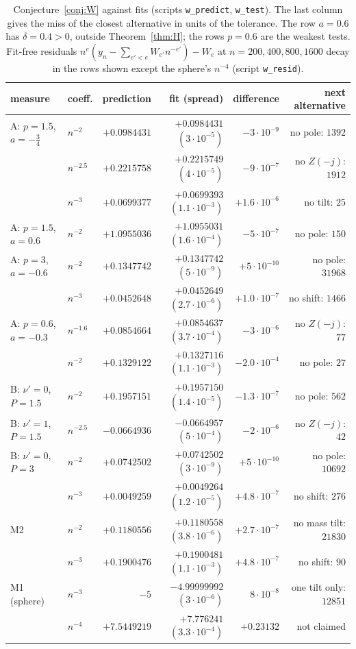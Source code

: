 \begin{table}[ht]
\centering
\footnotesize
\setlength{\tabcolsep}{4pt}
\begin{tabular}{llrrrr}
\toprule
measure & coeff. & prediction & fit (spread) & difference & next alternative\\
\midrule
A: $p=1.5$, $a=-\frac34$ & $n^{-2}$ & $+0.0984431$ & $+0.0984431$ $(3\cdot10^{-5})$ & $-3\cdot10^{-9}$ & no pole: $1392$\\
 & $n^{-2.5}$ & $+0.2215758$ & $+0.2215749$ $(4\cdot10^{-5})$ & $-9\cdot10^{-7}$ & no $Z(-j)$: $1912$\\
 & $n^{-3}$ & $+0.0699377$ & $+0.0699393$ $(1.1\cdot10^{-3})$ & $+1.6\cdot10^{-6}$ & no tilt: $25$\\
A: $p=1.5$, $a=0.6$ & $n^{-2}$ & $+1.0955036$ & $+1.0955031$ $(1.6\cdot10^{-4})$ & $-5\cdot10^{-7}$ & no pole: $150$\\
A: $p=3$, $a=-0.6$ & $n^{-2}$ & $+0.1347742$ & $+0.1347742$ $(5\cdot10^{-9})$ & $+5\cdot10^{-10}$ & no pole: $31968$\\
 & $n^{-3}$ & $+0.0452648$ & $+0.0452649$ $(2.7\cdot10^{-6})$ & $+1.0\cdot10^{-7}$ & no shift: $1466$\\
A: $p=0.6$, $a=-0.3$ & $n^{-1.6}$ & $+0.0854664$ & $+0.0854637$ $(3.7\cdot10^{-4})$ & $-3\cdot10^{-6}$ & no $Z(-j)$: $77$\\
 & $n^{-2}$ & $+0.1329122$ & $+0.1327116$ $(1.1\cdot10^{-3})$ & $-2.0\cdot10^{-4}$ & no pole: $27$\\
B: $\nu'=0$, $P=1.5$ & $n^{-2}$ & $+0.1957151$ & $+0.1957150$ $(1.4\cdot10^{-5})$ & $-1.3\cdot10^{-7}$ & no pole: $562$\\
B: $\nu'=1$, $P=1.5$ & $n^{-2.5}$ & $-0.0664936$ & $-0.0664957$ $(5\cdot10^{-4})$ & $-2\cdot10^{-6}$ & no $Z(-j)$: $42$\\
B: $\nu'=0$, $P=3$ & $n^{-2}$ & $+0.0742502$ & $+0.0742502$ $(3\cdot10^{-9})$ & $+5\cdot10^{-10}$ & no pole: $10692$\\
 & $n^{-3}$ & $+0.0049259$ & $+0.0049264$ $(1.2\cdot10^{-5})$ & $+4.8\cdot10^{-7}$ & no shift: $276$\\
M2 & $n^{-2}$ & $+0.1180556$ & $+0.1180558$ $(3.8\cdot10^{-6})$ & $+2.7\cdot10^{-7}$ & no mass tilt: $21830$\\
 & $n^{-3}$ & $+0.1900476$ & $+0.1900481$ $(1.1\cdot10^{-3})$ & $+4.8\cdot10^{-7}$ & no shift: $90$\\
M1 (sphere) & $n^{-3}$ & $-5$ & $-4.99999992$ $(3\cdot10^{-6})$ & $8\cdot10^{-8}$ & one tilt only: $12851$\\
 & $n^{-4}$ & $+7.5449219$ & $+7.776241$ $(3.3\cdot10^{-4})$ & $+0.23132$ & not claimed\\
\bottomrule
\end{tabular}
\caption{Conjecture~\ref{conj:W} against fits (scripts \texttt{w\_predict}, \texttt{w\_test}). The last column gives the miss of the
closest alternative in units of the tolerance. The row $a=0.6$ has $\delta=0.4>0$, outside Theorem~\ref{thm:H}; the rows $p=0.6$ are the
weakest tests. Fit-free residuals $n^e(y_n-\sum_{e'<e}W_{e'}n^{-e'})-W_e$ at $n=200,400,800,1600$ decay in the rows shown except the sphere's $n^{-4}$ (script
\texttt{w\_resid}).}
\label{tab:W}
\end{table}

